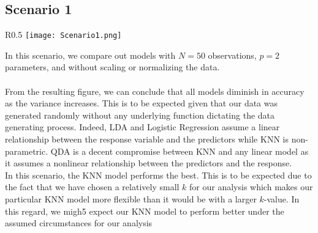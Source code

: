 \documentclass[11pt, oneside]{article}
\begin{document}
\pagebreak

\subsection*{Scenario 1}

\begin{wrapfigure}[]{R}{0.5\textwidth}
\vspace{-0.55cm}
\texttt{[image: Scenario1.png]}
\vspace{-.55cm}
\end{wrapfigure}
In this scenario, we compare out models with $N=50$ observations, $p=2$ parameters, and without scaling or normalizing the data.\\
\\
From the resulting figure, we can conclude that all models diminish in accuracy as the variance increases. This is to be expected given that our data was generated randomly without any underlying function dictating the data generating process. Indeed, LDA and Logistic Regression assume a linear relationship between the response variable and the predictors while KNN is non-parametric. QDA is a decent compromise between KNN and any linear model as it assumes a nonlinear relationship between the predictors and the response.\\

In this scenario, the KNN model performs the best. This is to be expected due to the fact that we have chosen a relatively small $k$ for our analysis which makes our particular KNN model more flexible than it would be with a larger $k$-value. In this regard, we migh5 expect our KNN model to perform better under the assumed circumstances for our analysis
\end{document}
